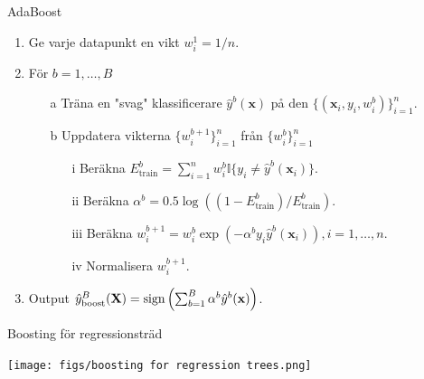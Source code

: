 \documentclass[10pt,english]{beamer}
\begin{document}
\begin{frame}{AdaBoost}

    \begin{enumerate}
        \item Ge varje datapunkt en vikt $w_i^1 = 1/n$.
        \item För $b = 1, \ldots, B$
        \begin{enumerate}
            \item[a] Träna en "svag" klassificerare $\hat{y}^{b}(\mathbf{x})$ på den  $\{(\mathbf{x}_i,y_i,w_i^b)\}_{i=1}^{n}$.
            \item[b] Uppdatera vikterna $\{w_{i}^{b+1}\}_{i=1}^{n}$ från $\{w_{i}^{b}\}_{i=1}^{n}$
            \begin{enumerate}
                \item[i] Beräkna $E_{\text{train}}^{b} = \sum_{i=1}^{n} w_{i}^{b} \mathbb{I}\{y_i \neq \hat{y}^{b}(\mathbf{x}_i)\}$.
                \item[ii] Beräkna $\alpha^{b} = 0.5 \log((1 - E_{\text{train}}^{b})/E_{\text{train}}^{b})$.
                \item[iii] Beräkna $w_{i}^{b+1} = w_i^b \exp(- \alpha^{b} y_i \hat{y}^{b}(\mathbf{x}_i)), i = 1,\ldots,n$.
                \item[iv] Normalisera $w_i^{b+1}$. 
            \end{enumerate}
        \end{enumerate}
        \item Output $\hat{y}^{B}_{\text{boost}}(\mathbf{X}) = \operatorname*{sign}\left(\sum_{b=1}^{B} \alpha^b \hat{y}^{b}(\mathbf{x})\right)$.
    \end{enumerate}
    
\end{frame}

\begin{frame}{Boosting för regressionsträd}

    \texttt{[image: figs/boosting for regression trees.png]}
    
\end{frame}
\end{document}
